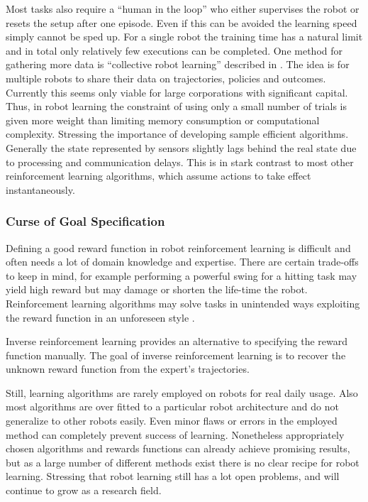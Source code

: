 Most tasks also require a ``human in the loop'' who either supervises the robot
or resets the setup after one episode. Even if this can be avoided the learning
speed simply cannot be sped up.
For a single robot the training time has a natural limit
and in total only relatively few executions can be completed.
One method for gathering more data is ``collective robot learning'' described in
\citet{kehoe2015survey}. The idea is for multiple robots to
share their data on trajectories, policies and outcomes. Currently this seems only
viable for large corporations with significant capital.
Thus, in robot learning the constraint of using only a small number of trials
is given more weight than limiting memory consumption or computational complexity.
Stressing the importance of developing sample efficient algorithms.
Generally the state represented by sensors slightly lags behind the real
state due to processing and communication delays. This is in stark contrast to
most other reinforcement learning algorithms, which assume actions to take effect
instantaneously.

\subsubsection{Curse of Goal Specification}
Defining a good reward function in robot reinforcement learning is
difficult and often needs a lot of domain knowledge and expertise.
There are certain trade-offs to keep in mind, for example performing
a powerful swing for a hitting task may yield high reward but may damage
or shorten the life-time the robot.
Reinforcement learning algorithms may solve tasks
in unintended ways exploiting the reward function in an unforeseen style
\citep{ng1999policy}.

Inverse reinforcement learning \citep{russell1998learning}
provides an alternative  to specifying the reward function manually.
The goal of inverse reinforcement learning is to recover the unknown
reward function from the expert's trajectories.

Still, learning algorithms are rarely employed on robots
for real daily usage. Also most
algorithms are over fitted to a particular robot architecture
and do not generalize to other robots easily.
Even minor flaws or errors in the employed method can completely prevent
success of learning.
Nonetheless appropriately chosen algorithms and rewards functions
can already achieve promising results, but as 
a large number of different methods exist 
there is no clear recipe for robot learning.
Stressing that robot learning still has a lot open problems,
and will continue to grow as a research field.

